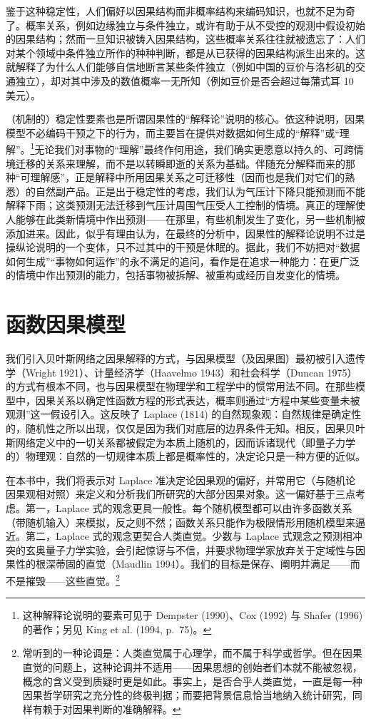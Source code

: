 鉴于这种稳定性，人们偏好以因果结构而非概率结构来编码知识，也就不足为奇了。概率关系，例如边缘独立与条件独立，或许有助于从不受控的观测中假设初始的因果结构；然而一旦知识被铸入因果结构，这些概率关系往往就被遗忘了：人们对某个领域中条件独立所作的种种判断，都是从已获得的因果结构派生出来的。这就解释了为什么人们能够自信地断言某些条件独立（例如中国的豆价与洛杉矶的交通独立），却对其中涉及的数值概率一无所知（例如豆价是否会超过每蒲式耳 10 美元）。

（机制的）稳定性要素也是所谓因果性的“解释论”说明的核心。依这种说明，因果模型不必编码干预之下的行为，而主要旨在提供对数据如何生成的“解释”或“理解”。\footnote{这种解释论说明的要素可见于 Dempster (1990)、Cox (1992) 与 Shafer (1996) 的著作；另见 King et al. (1994, p.~75)。}无论我们对事物的“理解”最终作何用途，我们确实更愿意以持久的、可跨情境迁移的关系来理解，而不是以转瞬即逝的关系为基础。伴随充分解释而来的那种“可理解感”，正是解释中所用因果关系之可迁移性（因而也是我们对它们的熟悉）的自然副产品。正是出于稳定性的考虑，我们认为气压计下降只能预测而不能解释下雨；这类预测无法迁移到气压计周围气压受人工控制的情境。真正的理解使人能够在此类新情境中作出预测——在那里，有些机制发生了变化，另一些机制被添加进来。因此，似乎有理由认为，在最终的分析中，因果性的解释论说明不过是操纵论说明的一个变体，只不过其中的干预是休眠的。据此，我们不妨把对“数据如何生成”“事物如何运作”的永不满足的追问，看作是在追求一种能力：在更广泛的情境中作出预测的能力，包括事物被拆解、被重构或经历自发变化的情境。

\section{函数因果模型}

我们引入贝叶斯网络之因果解释的方式，与因果模型（及因果图）最初被引入遗传学（Wright 1921）、计量经济学（Haavelmo 1943）和社会科学（Duncan 1975）的方式有根本不同，也与因果模型在物理学和工程学中的惯常用法不同。在那些模型中，因果关系以确定性函数方程的形式表达，概率则通过“方程中某些变量未被观测”这一假设引入。这反映了 Laplace (1814) 的自然现象观：自然规律是确定性的，随机性之所以出现，仅仅是因为我们对底层的边界条件无知。相反，因果贝叶斯网络定义中的一切关系都被假定为本质上随机的，因而诉诸现代（即量子力学的）物理观：自然的一切规律本质上都是概率性的，决定论只是一种方便的近似。

在本书中，我们将表示对 Laplace 准决定论因果观的偏好，并常用它（与随机论因果观相对照）来定义和分析我们所研究的大部分因果对象。这一偏好基于三点考虑。第一，Laplace 式的观念更具一般性。每个随机模型都可以由许多函数关系（带随机输入）来模拟，反之则不然；函数关系只能作为极限情形用随机模型来逼近。第二，Laplace 式的观念更契合人类直觉。少数与 Laplace 式观念之预测相冲突的玄奥量子力学实验，会引起惊讶与不信，并要求物理学家放弃关于定域性与因果性的根深蒂固的直觉（Maudlin 1994）。我们的目标是保存、阐明并满足——而不是摧毁——这些直觉。\footnote{常听到的一种论调是：人类直觉属于心理学，而不属于科学或哲学。但在因果直觉的问题上，这种论调并不适用——因果思想的创始者们本就不能被忽视，概念的含义受到质疑时更是如此。事实上，是否合乎人类直觉，一直是每一种因果哲学研究之充分性的终极判据；而要把背景信息恰当地纳入统计研究，同样有赖于对因果判断的准确解释。}

